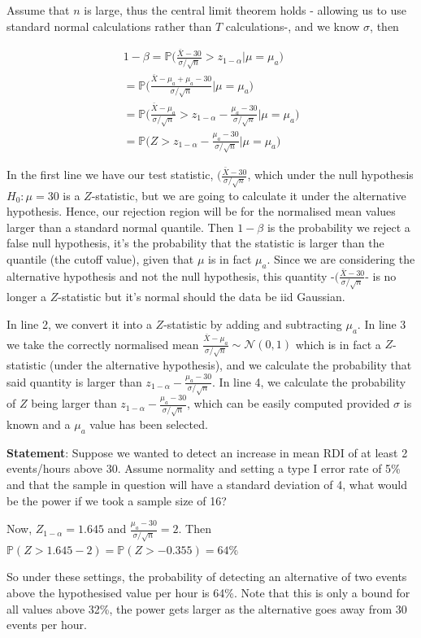 \documentclass{homework}
\begin{document}
Assume that $n$ is large, thus the central limit theorem holds - allowing us to use standard normal calculations rather than $T$ calculations-, and we know $\sigma$, then

\begin{align*}
    1- \beta = \mathds{P}\bigg(\frac{\bar{X}-30}{\sigma/\sqrt{n}} > z_{1-\alpha}\bigg|\mu = \mu_a\bigg) \\
    = \mathds{P}\bigg(\frac{\bar{X}-\mu_a+\mu_a-30}{\sigma/\sqrt{n}}\bigg| \mu = \mu_a\bigg) \\
    = \mathds{P}\bigg(\frac{\bar{X}-\mu_a}{\sigma/\sqrt{n}}> z_{1-\alpha}-\frac{\mu_a-30}{\sigma/\sqrt{n}}\bigg|\mu = \mu_a\bigg) \\
    = \mathds{P}\bigg(Z > z_{1-\alpha} -\frac{\mu_a-30}{\sigma/\sqrt{n}} \bigg|\mu = \mu_a\bigg)
\end{align*}

In the first line we have our test statistic, $(\frac{\bar{X}-30}{\sigma/\sqrt{n}}$, which under the null hypothesis $H_0 : \mu = 30$ is a $Z$-statistic, but we are going to calculate it under the alternative hypothesis. Hence, our rejection region will be for the normalised mean values larger than a standard normal quantile. Then $1-\beta$ is the probability we reject a false null hypothesis, it's the probability that the statistic is larger than the quantile (the cutoff value), given that $\mu$ is in fact $\mu_a$. 
Since we are considering the alternative hypothesis and not the null hypothesis, this quantity -$(\frac{\bar{X}-30}{\sigma/\sqrt{n}}$- is no longer a $Z$-statistic but it's normal should the data be iid Gaussian. 

In line 2, we convert it into a $Z$-statistic by adding and subtracting $\mu_a$. In line 3 we take the correctly normalised mean $\frac{\bar{X}-\mu_a}{\sigma/\sqrt{n}} \sim \mathcal{N}(0, 1)$ which is in fact a $Z$-statistic (under the alternative hypothesis), and we calculate the probability that said quantity is larger than $z_{1-\alpha}-\frac{\mu_a-30}{\sigma/\sqrt{n}}$. 
In line 4, we calculate the probability of $Z$ being larger than $z_{1-\alpha}-\frac{\mu_a-30}{\sigma/\sqrt{n}}$, which can be easily computed provided $\sigma$ is known and a $\mu_a$ value has been selected. \\

\begin{tcolorbox}[title=Example]

\textbf{Statement}: Suppose we wanted to detect an increase in mean RDI of at least 2 events/hours above 30. Assume normality and setting a type I error rate of 5\% and that the sample in question will have a standard deviation of 4, what would be the power if we took a sample size of 16?

Now, $Z_{1-\alpha} = 1.645$ and $\frac{\mu_a-30}{\sigma/\sqrt{n}} = 2$. Then $\mathds{P}(Z > 1.645 - 2)  = \mathds{P}(Z > -0.355) = 64\%$

So under these settings, the probability of detecting an alternative of two events above the hypothesised value per hour is 64\%. Note that this is only a bound for all values above 32\%, the power gets larger as the alternative goes away from 30 events per hour.

\end{tcolorbox}
\end{document}
